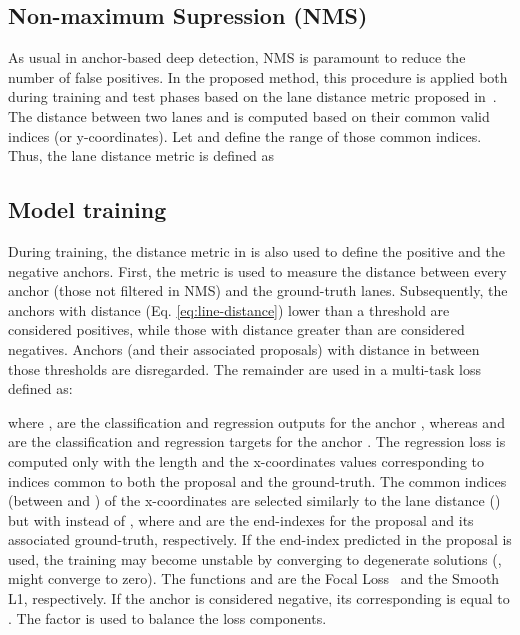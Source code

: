 \documentclass[final]{cvpr}
\begin{document}
\subsection{Non-maximum Supression (NMS)}

As usual in anchor-based deep detection, NMS is paramount to reduce the number of false positives. In the proposed method, this procedure is applied both during training and test phases based on the lane distance metric proposed in~\cite{linecnn}. The distance between two lanes  and  is computed based on their common valid indices (or y-coordinates). Let  and  define the range of those common indices. Thus, the lane distance metric is defined as





\subsection{Model training}

During training, the distance metric in  is also used to define the positive and the negative anchors. First, the metric is used to measure the distance between every anchor (those not filtered in NMS) and the ground-truth lanes. Subsequently, the anchors with distance (Eq. \ref{eq:line-distance}) lower than a threshold  are considered positives, while those with distance greater than  are considered negatives. Anchors (and their associated proposals) with distance in between those thresholds are disregarded. The remainder  are used in a multi-task loss defined as:


where ,  are the classification and regression outputs for the anchor , whereas  and  are the classification and regression targets for the anchor . The regression loss is computed only with the length  and the x-coordinates values corresponding to indices common to both the proposal and the ground-truth. The common indices (between  and ) of the x-coordinates are selected similarly to the lane distance () but with  instead of , where  and  are the end-indexes for the proposal and its associated ground-truth, respectively. If the end-index predicted in the proposal  is used, the training may become unstable by converging to degenerate solutions (\eg,  might converge to zero). The functions  and  are the Focal Loss~\cite{focal-loss} and the Smooth L1, respectively. If the anchor  is considered negative, its corresponding  is equal to . The factor  is used to balance the loss components.
\end{document}
